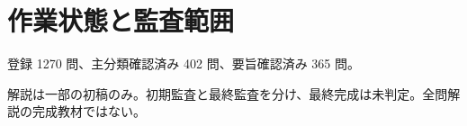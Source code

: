\chapter{作業状態と監査範囲}
登録 1270 問、主分類確認済み 402 問、要旨確認済み 365 問。
\par 解説は一部の初稿のみ。初期監査と最終監査を分け、最終完成は未判定。全問解説の完成教材ではない。
